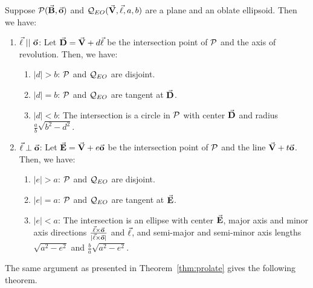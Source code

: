 \begin{lemma}
     Suppose ${\cal P}(\vec{\bf B},\vec{\bf o})$ and
${\cal Q}_{EO}(\vec{\bf V},\vec{\bf \ell},a,b)$ are a plane and an oblate
ellipsoid.  Then we have:
\begin{enumerate}
     \item $\vec{\bf \ell}\ ||\ \vec{\bf o}$:
          Let $\vec{\bf D}=\vec{\bf V}+d\vec{\bf \ell}$ be the intersection
          point of ${\cal P}$ and the axis of revolution.
          Then, we have:
     \begin{enumerate}
          \item $|d|>b$: ${\cal P}$ and ${\cal Q}_{EO}$ are disjoint.
          \item $|d|=b$: ${\cal P}$ and ${\cal Q}_{EO}$ are tangent at
               $\vec{\bf D}$.
          \item $|d|<b$: The intersection is a circle in ${\cal P}$ with
               center $\vec{\bf D}$ and radius $\frac{a}{b}\sqrt{b^2-d^2}$.
     \end{enumerate}
     \item $\vec{\bf \ell}\perp\vec{\bf o}$:
          Let $\vec{\bf E}=\vec{\bf V}+e\vec{\bf o}$ be the intersection
          point of ${\cal P}$ and the line $\vec{\bf V}+t\vec{\bf o}$.
          Then, we have:
     \begin{enumerate}
          \item $|e|>a$: ${\cal P}$ and ${\cal Q}_{EO}$ are disjoint.
          \item $|e|=a$: ${\cal P}$ and ${\cal Q}_{EO}$ are tangent at
               $\vec{\bf E}$.
          \item $|e|<a$: The intersection is an ellipse with center
               $\vec{\bf E}$, major axis and minor axis directions
          $\frac{\vec{\bf \ell}\times\vec{\bf o}}{|\vec{\bf \ell}\times\vec{\bf o}|}$
               and $\vec{\bf \ell}$,
               and semi-major and semi-minor axis lengths $\sqrt{a^2-e^2}$
               and $\frac{b}{a}\sqrt{a^2-e^2}$.
     \end{enumerate}
\end{enumerate}
\end{lemma}

     The same argument as presented in Theorem~\ref{thm:prolate}
gives the following theorem.

